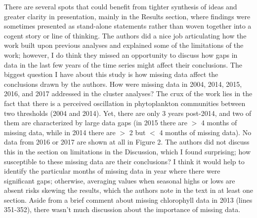 \documentclass[12pt,english]{reviewresponse}
\begin{document}
\begin{revcomment}\label{comment:first-rev2}
	There are several spots that could benefit from tighter synthesis of ideas and greater clarity in presentation, mainly in the Results section, where findings were sometimes presented as stand-alone statements rather than woven together into a cogent story or line of thinking. The authors did a nice job articulating how the work built upon previous analyses and explained some of the limitations of the work; however, I do think they missed an opportunity to discuss how gaps in data in the last few years of the time series might affect their conclusions. The biggest question I have about this study is how missing data affect the conclusions drawn by the authors. How were missing data in 2004, 2014, 2015, 2016, and 2017 addressed in the cluster analyses? The crux of the work lies in the fact that there is a perceived oscillation in phytoplankton communities between two thresholds (2004 and 2014). Yet, there are only 3 years post-2014, and two of them are characterized by large data gaps (in 2015 there are $>$ 4 months of missing data, while in 2014 there are $>$ 2 but $<$ 4 months of missing data). No data from 2016 or 2017 are shown at all in Figure 2. The authors did not discuss this in the section on limitations in the Discussion, which I found surprising; how susceptible to these missing data are their conclusions? I think it would help to identify the particular months of missing data in year where there were significant gaps; otherwise, averaging values when seasonal highs or lows are absent risks skewing the results, which the authors note in the text in at least one section. Aside from a brief comment about missing chlorophyll data in 2013 (lines 351-352), there wasn’t much discussion about the importance of missing data.
\end{revcomment}
\end{document}
